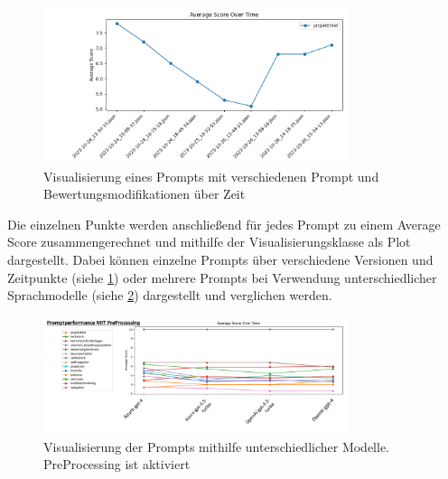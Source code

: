 \begin{figure}[h]
    \centering
    \includegraphics[width=0.8\textwidth]{figures/02_Prompt_Evaluierung.png}
    \caption{Visualisierung eines Prompts mit verschiedenen Prompt und Bewertungsmodifikationen über Zeit}
    \label{figure:02_Prompt_Evaluierung}     %
\end{figure}

Die einzelnen Punkte werden anschließend für jedes Prompt zu einem Average Score zusammengerechnet und mithilfe der Visualisierungsklasse als Plot dargestellt. 
Dabei können einzelne Prompts über verschiedene Versionen und Zeitpunkte (siehe \ref{figure:02_Prompt_Evaluierung}) oder mehrere Prompts bei Verwendung 
unterschiedlicher Sprachmodelle (siehe \ref{fig:04_Prompt_Evaluierung-MitPreProcessing}) dargestellt und verglichen werden.

\begin{figure}[h]
    \centering
    \includegraphics[width=0.8\textwidth]{figures/04_Prompt_Evaluierung-MitPreProcessing.png}
    \caption{Visualisierung der Prompts mithilfe unterschiedlicher Modelle. PreProcessing ist aktiviert}
    \label{fig:04_Prompt_Evaluierung-MitPreProcessing}    %
\end{figure}

